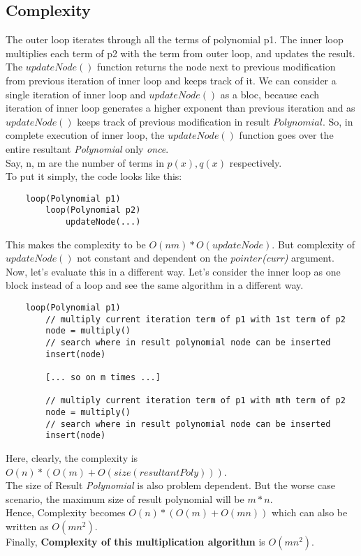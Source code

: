 \subsection{Complexity}
The outer loop iterates through all the terms of polynomial p1. The inner loop multiplies each term of p2 with the term from outer loop, and updates the result. The $updateNode()$ function returns the node next to previous modification from previous iteration of inner loop and keeps track of it. We can consider a single iteration of inner loop and $updateNode()$ as a bloc, because each iteration of inner loop generates a higher exponent than previous iteration and as $updateNode()$ keeps track of previous modification in result $Polynomial$.
So, in complete execution of inner loop, the $updateNode()$ function goes over the entire resultant \textit{Polynomial} only \textit{once}. \vspace{5pt} \\
Say, n, m are the number of terms in $p(x), q(x)$ respectively. \vspace{5pt} \\
To put it simply, the code looks like this:
\begin{lstlisting}
    loop(Polynomial p1)
        loop(Polynomial p2)
            updateNode(...)
\end{lstlisting}
This makes the complexity to be $O(nm)*O(updateNode)$. But complexity of $updateNode()$ not constant and dependent on the $pointer$\textit{(curr)} argument. Now, let's evaluate this in a different way. Let's consider the inner loop as one block instead of a loop and see the same algorithm in a different way.
\begin{lstlisting}
    loop(Polynomial p1)
        // multiply current iteration term of p1 with 1st term of p2
        node = multiply()
        // search where in result polynomial node can be inserted
        insert(node)
        
        [... so on m times ...]
        
        // multiply current iteration term of p1 with mth term of p2
        node = multiply()
        // search where in result polynomial node can be inserted
        insert(node)
\end{lstlisting}
Here, clearly, the complexity is $O(n)*(O(m)+O(size(resultant Poly)))$. \vspace{5pt} \\
The size of Result \textit{Polynomial} is also problem dependent. But the worse case scenario,  the maximum size of result polynomial will be $m*n$.\vspace{5pt} \\
Hence, Complexity becomes $O(n)*(O(m)+O(mn))$ which can also be written as $O(mn^2)$. \vspace{5pt} \\
Finally, \textbf{Complexity of this multiplication algorithm} is $O(mn^2)$.